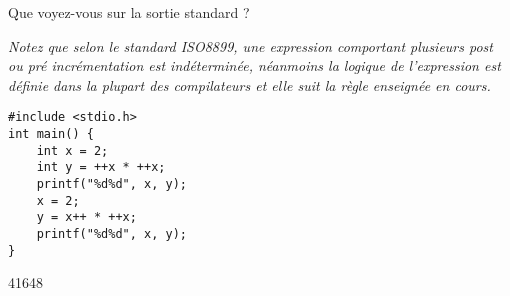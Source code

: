 \documentclass[french,a4paper,addpoints,11pt]{exam}
\begin{document}
\begin{questions}

\question Que voyez-vous sur la sortie standard ?

\emph{Notez que selon le standard ISO8899, une expression comportant plusieurs post ou pré incrémentation est indéterminée, néanmoins la logique de l'expression est définie dans la plupart des compilateurs et elle suit la règle enseignée en cours.}

\begin{lstlisting}
#include <stdio.h>
int main() {
    int x = 2;
    int y = ++x * ++x;
    printf("%d%d", x, y);
    x = 2;
    y = x++ * ++x;
    printf("%d%d", x, y);
}
\end{lstlisting}

\ifprintanswers
\begin{solution}
41648
\end{solution}
\else
\fillwithdottedlines{1cm}
\fi

\end{questions}
\end{document}
